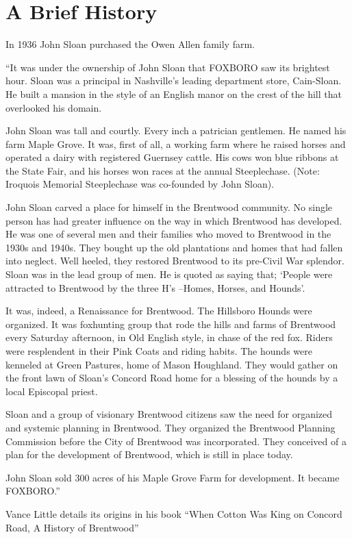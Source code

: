 \section{A Brief History}

In 1936 John Sloan purchased the Owen Allen family farm.

``It was under the ownership of John Sloan that FOXBORO saw its brightest
hour. Sloan was a principal in Nashville’s leading department store,
Cain-Sloan. He built a mansion in the style of an English manor on the
crest of the hill that overlooked his domain.

John Sloan was tall and courtly. Every inch a patrician gentlemen. He
named his farm Maple Grove. It was, first of all, a working farm where he
raised horses and operated a dairy with registered Guernsey cattle. His
cows won blue ribbons at the State Fair, and his horses won races at the
annual Steeplechase. (Note: Iroquois Memorial Steeplechase was co-founded
by John Sloan).

John Sloan carved a place for himself in the Brentwood community. No
single person has had greater influence on the way in which Brentwood
has developed. He was one of several men and their families who moved to
Brentwood in the 1930s and 1940s. They bought up the old plantations and
homes that had fallen into neglect. Well heeled, they restored Brentwood
to its pre-Civil War splendor. Sloan was in the lead group of men. He
is quoted as saying that; ‘People were attracted to Brentwood by the
three H’s –Homes, Horses, and Hounds’.

It was, indeed, a Renaissance for Brentwood. The Hillsboro Hounds were
organized. It was foxhunting group that rode the hills and farms of
Brentwood every Saturday afternoon, in Old English style, in chase of
the red fox. Riders were resplendent in their Pink Coats and riding
habits. The hounds were kenneled at Green Pastures, home of Mason
Houghland. They would gather on the front lawn of Sloan’s Concord Road
home for a blessing of the hounds by a local Episcopal priest.

Sloan and a group of visionary Brentwood citizens saw the need for
organized and systemic planning in Brentwood. They organized the Brentwood
Planning Commission before the City of Brentwood was incorporated. They
conceived of a plan for the development of Brentwood, which is still in
place today.

John Sloan sold 300 acres of his Maple Grove Farm for development. It
became FOXBORO.''

Vance Little details its origins in his book ``When Cotton Was King on
Concord Road, A History of Brentwood''
